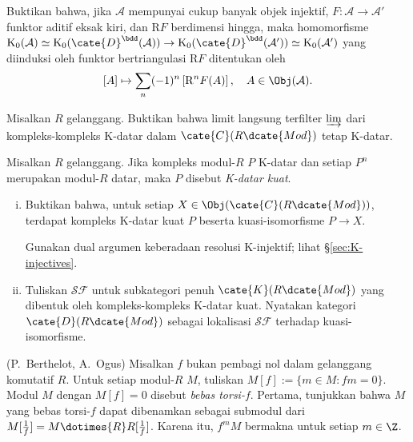 \begin{Exercises}
	\item Buktikan bahwa, jika $\mathcal{A}$ mempunyai cukup banyak objek
	injektif, $F:\mathcal{A}\to\mathcal{A}'$ funktor aditif eksak kiri, dan
	$\mathrm{R}F$ berdimensi hingga, maka homomorfisme
	$\mathrm{K}_0(\mathcal{A})\simeq\mathrm{K}_0(\cate{D}^{\bdd}(\mathcal{A}))
	\to\mathrm{K}_0(\cate{D}^{\bdd}(\mathcal{A}'))\simeq
	\mathrm{K}_0(\mathcal{A}')$ yang diinduksi oleh funktor bertriangulasi
	$\mathrm{R}F$ ditentukan oleh
	\[ [A] \mapsto \sum_n (-1)^n \left[\mathrm{R}^n F(A)\right], \quad A \in \Obj(\mathcal{A}). \]

	\item Misalkan $R$ gelanggang. Buktikan bahwa limit langsung terfilter
	$\varinjlim$ dari kompleks-kompleks K-datar dalam
	$\cate{C}(R\dcate{Mod})$ tetap K-datar.
	
	\item Misalkan $R$ gelanggang. Jika kompleks modul-$R$ $P$ K-datar dan
	setiap $P^n$ merupakan modul-$R$ datar, maka $P$ disebut
	\emph{K-datar kuat}.
	\begin{enumerate}[(i)]
		\item Buktikan bahwa, untuk setiap
		$X\in\Obj(\cate{C}(R\dcate{Mod}))$, terdapat kompleks K-datar kuat $P$
		beserta kuasi-isomorfisme $P\to X$.
		\begin{hint}
			Gunakan dual argumen keberadaan resolusi K-injektif; lihat
			\S\ref{sec:K-injectives}.
		\end{hint}
		\item Tuliskan $\mathcal{SF}$ untuk subkategori penuh
		$\cate{K}(R\dcate{Mod})$ yang dibentuk oleh kompleks-kompleks K-datar
		kuat. Nyatakan kategori $\cate{D}(R\dcate{Mod})$ sebagai lokalisasi
		$\mathcal{SF}$ terhadap kuasi-isomorfisme.
	\end{enumerate}

	\item (P.\ Berthelot, A.\ Ogus) Misalkan $f$ bukan pembagi nol dalam
	gelanggang komutatif $R$. Untuk setiap modul-$R$ $M$, tuliskan
	$M[f]:=\{m\in M:fm=0\}$. Modul $M$ dengan $M[f]=0$ disebut
	\emph{bebas torsi-$f$}. Pertama, tunjukkan bahwa $M$ yang bebas torsi-$f$
	dapat dibenamkan sebagai submodul dari
	$M[\frac{1}{f}]=M\dotimes{R}R[\frac{1}{f}]$. Karena itu, $f^mM$
	bermakna untuk setiap $m\in\Z$.


\end{Exercises}

